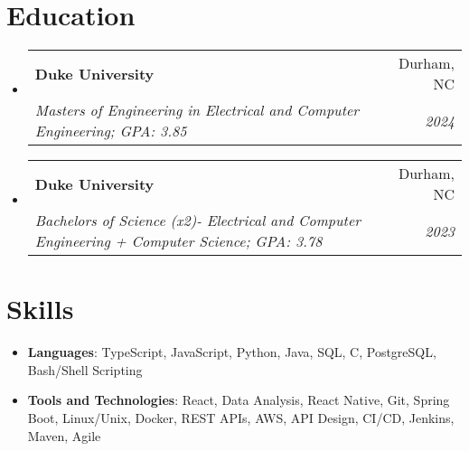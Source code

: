 \documentclass[letterpaper,11pt]{article}
\makeatletter
\newcommand{\resumeSubheading}[4]{
  \vspace{-1pt}\item
    \begin{tabular*}{0.97\textwidth}{l@{\extracolsep{\fill}}r}
      \textbf{#1} & #2 \\
      \textit{\small#3} & \textit{\small #4} \\
    \end{tabular*}\vspace{-5pt}
}
\newcommand{\resumeSubHeadingListStart}{\begin{itemize}[leftmargin=*]}
\newcommand{\resumeSubHeadingListEnd}{\end{itemize}}
\makeatother
\begin{document}
\section{Education}
  \resumeSubHeadingListStart
    \resumeSubheading
      {Duke University}{Durham, NC}
      {Masters of Engineering in Electrical and Computer Engineering;  GPA: 3.85}{2024}
    \resumeSubheading
      {Duke University}{Durham, NC}
      {Bachelors of Science (x2)- Electrical and Computer Engineering + Computer Science;  GPA: 3.78}{2023}
  \resumeSubHeadingListEnd

\section{Skills}
 \resumeSubHeadingListStart
   \item{
     \textbf{Languages}{: TypeScript, JavaScript, Python, Java, SQL, C, PostgreSQL, Bash/Shell Scripting}
   }
   \item{
     \textbf{Tools and Technologies}{: React, Data Analysis, React Native, Git, Spring Boot, Linux/Unix, Docker, REST APIs, AWS, API Design, CI/CD, Jenkins, Maven, Agile}
   }
 \resumeSubHeadingListEnd

\end{document}
